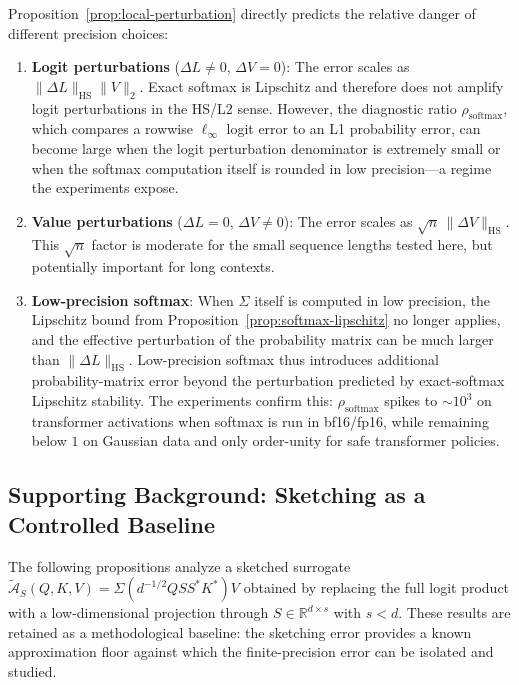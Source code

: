 \begin{remark}
    \label{rem:placement}
    Proposition~\ref{prop:local-perturbation} directly predicts the relative danger of different precision choices:
    \begin{enumerate}
        \item \textbf{Logit perturbations} ($\Delta L \neq 0$, $\Delta V = 0$): The error scales as $\|\Delta L\|_{\mathrm{HS}}\|V\|_2$. Exact softmax is Lipschitz and therefore does not amplify logit perturbations in the HS/L2 sense. However, the diagnostic ratio $\rho_{\mathrm{softmax}}$, which compares a rowwise $\ell_\infty$ logit error to an L1 probability error, can become large when the logit perturbation denominator is extremely small or when the softmax computation itself is rounded in low precision---a regime the experiments expose.
        \item \textbf{Value perturbations} ($\Delta L = 0$, $\Delta V \neq 0$): The error scales as $\sqrt{n}\,\|\Delta V\|_{\mathrm{HS}}$. This $\sqrt{n}$ factor is moderate for the small sequence lengths tested here, but potentially important for long contexts.
        \item \textbf{Low-precision softmax}: When $\Sigma$ itself is computed in low precision, the Lipschitz bound from Proposition~\ref{prop:softmax-lipschitz} no longer applies, and the effective perturbation of the probability matrix can be much larger than $\|\Delta L\|_{\mathrm{HS}}$. Low-precision softmax thus introduces additional probability-matrix error beyond the perturbation predicted by exact-softmax Lipschitz stability. The experiments confirm this: $\rho_{\mathrm{softmax}}$ spikes to $\sim\!10^3$ on transformer activations when softmax is run in bf16/fp16, while remaining below $1$ on Gaussian data and only order-unity for safe transformer policies.
    \end{enumerate}
\end{remark}

\subsection{Supporting Background: Sketching as a Controlled Baseline}

The following propositions analyze a sketched surrogate $\widetilde{\mathcal{A}}_S(Q,K,V) = \Sigma(d^{-1/2}QSS^*K^*)V$ obtained by replacing the full logit product with a low-dimensional projection through $S \in \mathbb{R}^{d \times s}$ with $s < d$. These results are retained as a methodological baseline: the sketching error provides a known approximation floor against which the finite-precision error can be isolated and studied.

